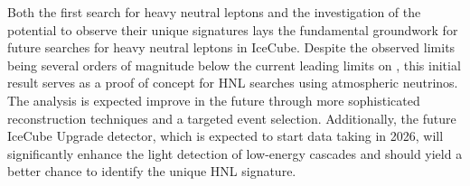 Both the first search for heavy neutral leptons and the investigation of the potential to observe their unique signatures lays the fundamental groundwork for future searches for heavy neutral leptons in IceCube. Despite the observed limits being several orders of magnitude below the current leading limits on , this initial result serves as a proof of concept for HNL searches using atmospheric neutrinos. The analysis is expected improve in the future through more sophisticated reconstruction techniques and a targeted event selection. Additionally, the future IceCube Upgrade detector, which is expected to start data taking in 2026, will significantly enhance the light detection of low-energy cascades and should yield a better chance to identify the unique HNL signature.
